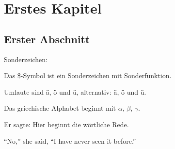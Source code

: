 \documentclass[12pt,a4paper,final]{scrbook}
\begin{document}
\chapter{Erstes Kapitel}
\section{Erster Abschnitt}
Sonderzeichen: 

Das \$-Symbol ist ein Sonderzeichen mit Sonderfunktion. 


Umlaute sind ä, ö und ü, 
alternativ: \"{a}, \"o und {\"u}. 

Das griechische Alphabet beginnt mit $\alpha$, $\beta$, $\gamma$. 

Er sagte: \glqq Hier beginnt die wörtliche Rede.\grqq
	
``No,'' she said, ``I have never seen it before.''
\end{document}
